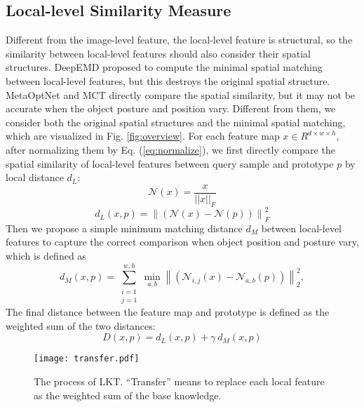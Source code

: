 \documentclass{article}
\begin{document}
\subsection{Local-level Similarity Measure}
\label{sec:distance}
Different from the image-level feature, the local-level feature is structural, so the similarity between local-level features should also consider their spatial structures. DeepEMD \cite{zhang2020deepemd} proposed to compute the minimal spatial matching between local-level features, but this destroys the original spatial structure. MetaOptNet \cite{lee2019meta} and MCT \cite{kye2020transductive} directly compare the spatial similarity, but it may not be accurate when the object posture and position vary. Different from them, we consider both the original spatial structures and the minimal spatial matching, which are visualized in Fig. \ref{fig:overview}. For each feature map $x \in R^{d\times w\times h}$, after normalizing them by Eq. (\ref{eq:normalize}), we first directly compare the spatial similarity of local-level features between query sample and prototype $p$ by local distance $d_L$:
\begin{equation}
    \label{eq:normalize}
    \mathcal N(x) = \frac{x}{||x||_F}
\end{equation}
\begin{equation}
    \label{eq:d_g}
    d_{L}(x, p) = \left\|  (\mathcal N(x) - \mathcal N(p) ) \right\|_F^2
\end{equation}
Then we propose a simple minimum matching distance $d_M$ between local-level features to capture the correct comparison when object position and posture vary, which is defined as
\begin{equation}
    \label{eq:d_m}
    d_{M}(x, p) = \sum_{\substack{i=1\\ j=1}}^{w, h} \min_{a, b} \left\| ( \mathcal N_{i, j}(x) - \mathcal N_{a, b}(p) ) \right\|^2_2 ,
\end{equation}
The final distance between the feature map and prototype is defined as the weighted sum of the two distances: \begin{equation}
    D(x, p) = d_{L}(x, p) + \gamma\ d_{M}(x, p)
\end{equation}



\begin{figure}[h]
	\begin{center}
        \vspace{-10pt}
	    \texttt{[image: transfer.pdf]}
	\end{center}
	\vspace{-15pt}
	\caption{ The process of LKT. ``Transfer'' means to replace each local feature as the weighted sum of the base knowledge. }
	\label{fig:adaption}
	\vspace{-10pt}
\end{figure}
\end{document}

